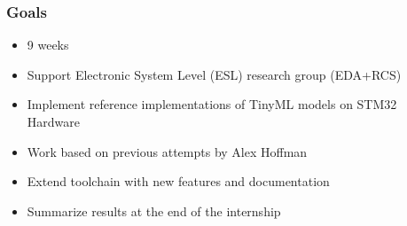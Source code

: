 \documentclass{tum-presentation}
\begin{document}
\begin{frame}
  \frametitle{Goals}
  
  \begin{itemize}
      \item 9 weeks
      \item Support Electronic System Level (ESL) research group (EDA+RCS)
      \item Implement reference implementations of TinyML models on STM32 Hardware
      \item Work based on previous attempts by Alex Hoffman
      \item Extend toolchain with new features and documentation
      \item Summarize results at the end of the internship
  \end{itemize}

\end{frame}
\end{document}

